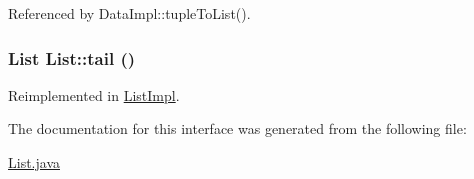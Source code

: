 Referenced by Data\-Impl::tuple\-To\-List().

\hypertarget{interfaceList_a1}{
\subsubsection[tail]{\setlength{\rightskip}{0pt plus 5cm}List List::tail ()}}
\label{interfaceList_a1}




Reimplemented in \hyperlink{classListImpl_a1}{List\-Impl}.

The documentation for this interface was generated from the following file:\begin{CompactItemize}
\item 
\hyperlink{List_8java-source}{List.java}\end{CompactItemize}
